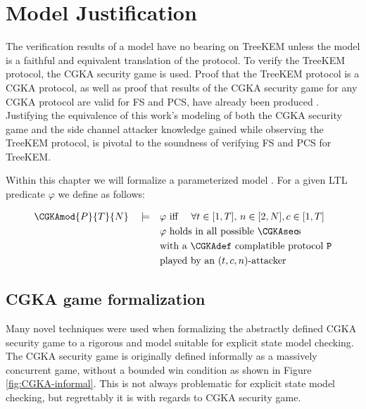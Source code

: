 \hypertarget{sec:justification}{%
\chapter{Model Justification}\label{sec:justification}}

The verification results of a model have no bearing on TreeKEM unless the model is a faithful and equivalent translation of the protocol.
To verify the TreeKEM protocol, the CGKA security game is used.
Proof that the TreeKEM protocol is a CGKA protocol, as well as proof that results of the CGKA security game for any CGKA protocol are valid for FS and PCS, have already been produced \autocite{alwen2020security}.
Justifying the equivalence of this work's modeling of both the CGKA security game and the side channel attacker knowledge gained while observing the TreeKEM protocol, is pivotal to the soundness of verifying FS and PCS for TreeKEM.

Within this chapter we will formalize a parameterized model .
For a given LTL predicate $\varphi$ we define  as follows:

\[
\begin{split}
\CGKAmod{P}{T}{N}\quad\models\quad& \varphi \textrm{ iff }\quad\forall t \in [1, T],\, n \in [2, N], c \in [1, T]\\
  & \varphi \textrm{ holds in all possible \CGKAsec\!s}\\
  & \textrm{with a \CGKAdef complatible protocol } \mathtt{P}\\
  & \textrm{played by an } (t, c, n)\textrm{-attacker}
\end{split}
\]

\hypertarget{sec:game-adaptations}{%
\section{CGKA game formalization}\label{sec:game-adaptations}}

Many novel techniques were used when formalizing the abstractly defined CGKA security game to a rigorous and model suitable for explicit state model checking.
The CGKA security game is originally defined informally as a massively concurrent game, without a bounded win condition as shown in Figure \ref{fig:CGKA-informal}.
This is not always problematic for explicit state model checking, but regrettably it is with regards to CGKA security game.

